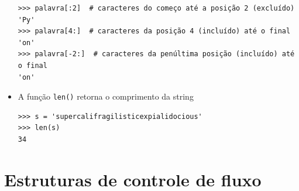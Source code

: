\begin{itemize}
	\begin{verbatim}
>>> palavra[:2]  # caracteres do começo até a posição 2 (excluído)
'Py'
>>> palavra[4:]  # caracteres da posição 4 (incluído) até o final
'on'
>>> palavra[-2:]  # caracteres da penúltima posição (incluído) até o final
'on'
	\end{verbatim}
	\item A função \verb|len()| retorna o comprimento da string
	\begin{verbatim}
>>> s = 'supercalifragilisticexpialidocious'
>>> len(s)
34
	\end{verbatim}
\end{itemize}

\section{Estruturas de controle de fluxo}
